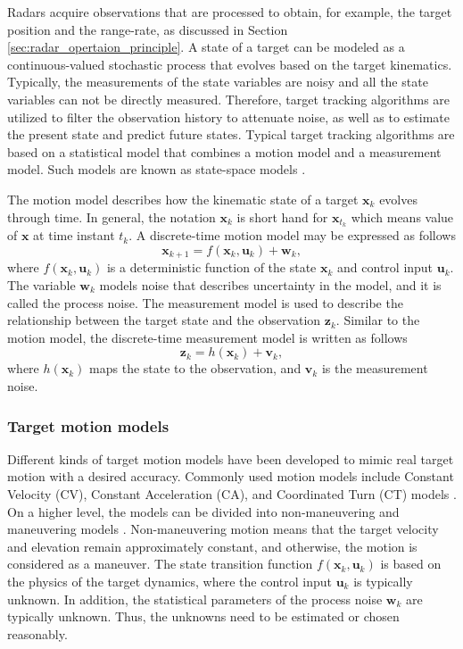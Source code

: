 \documentclass[english, 12pt, a4paper, elec, utf8, a-1b, online]{aaltothesis}
\numberwithin{equation}{section}
\renewcommand{\vec}[1]{\mathbf{#1}}
\newcommand{\x}{\vec{x}_k}
\newcommand{\xnext}{\vec{x}_{k+1}}
\newcommand{\z}{\vec{z}_k}
\newcommand{\cinput}{\vec{u}_k}
\newcommand{\pnoise}{\vec{w}_k}
\newcommand{\onoise}{\vec{v}_k}
\begin{document}
Radars acquire observations that are processed to obtain, for example, the target position and the range-rate, as discussed in Section \ref{sec:radar_opertaion_principle}.
A state of a target can be modeled as a continuous-valued stochastic process that evolves based on the target kinematics. 
Typically, the measurements of the state variables are noisy and all the state variables can not be directly measured.
Therefore, target tracking algorithms are utilized to filter the observation history to attenuate noise, as well as to estimate the present state and predict future states.
Typical target tracking algorithms are based on a statistical model that combines a motion model and a measurement model. 
Such models are known as state-space models \cite{RongLi2003}.

The motion model describes how the kinematic state of a target $\x$ evolves through time.
In general, the notation $\x$ is short hand for $\vec{x}_{t_k}$ which means value of $\vec{x}$ at time instant $t_k$. 
A discrete-time motion model may be expressed as follows \cite{RongLi2003}
\begin{equation}\label{eq:spm_motion}
    \xnext  = f(\x, \cinput) + \pnoise,
\end{equation}
where $f(\x, \cinput)$ is a deterministic function of the state $\x$ and control input $\cinput$.
The variable $\pnoise$ models noise that describes uncertainty in the model, and it is called the process noise.
The measurement model is used to describe the relationship between the target state and the observation $\z$. 
Similar to the motion model, the discrete-time measurement model is written as follows \cite{RongLi2003}
\begin{equation}\label{eq:spm_obs}
    \z = h(\x) + \onoise,
\end{equation}
where $h(\x)$ maps the state to the observation, and $\onoise$ is the measurement noise.

\subsubsection{Target motion models} \label{sec:target_models}

Different kinds of target motion models have been developed to mimic real target motion with a desired accuracy. 
Commonly used motion models include Constant Velocity (CV), Constant Acceleration (CA), and Coordinated Turn (CT) models \cite{RongLi2003}.
On a higher level, the models can be divided into non-maneuvering and maneuvering models \cite{RongLi2003}. 
Non-maneuvering motion means that the target velocity and elevation remain approximately constant, and otherwise, the motion is considered as a maneuver.
The state transition function $f(\x, \cinput)$ is based on the physics of the target dynamics, where the control input $\cinput$ is typically unknown.
In addition, the statistical parameters of the process noise $\pnoise$ are typically unknown.
Thus, the unknowns need to be estimated or chosen reasonably.
\end{document}
